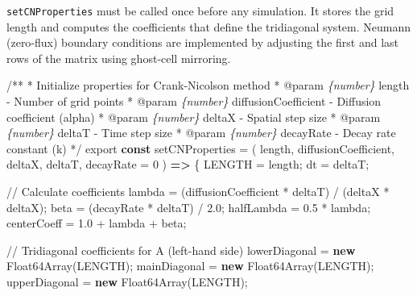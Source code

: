 \documentclass[
  letterpaper,
  DIV=11,
  numbers=noendperiod]{scrreprt}
\newenvironment{Shaded}{\begin{snugshade}}{\end{snugshade}}
\newcommand{\AnnotationTok}[1]{\textcolor[rgb]{0.37,0.37,0.37}{#1}}
\newcommand{\BuiltInTok}[1]{\textcolor[rgb]{0.00,0.23,0.31}{#1}}
\newcommand{\CommentTok}[1]{\textcolor[rgb]{0.37,0.37,0.37}{#1}}
\newcommand{\CommentVarTok}[1]{\textcolor[rgb]{0.37,0.37,0.37}{\textit{#1}}}
\newcommand{\DecValTok}[1]{\textcolor[rgb]{0.68,0.00,0.00}{#1}}
\newcommand{\FloatTok}[1]{\textcolor[rgb]{0.68,0.00,0.00}{#1}}
\newcommand{\ImportTok}[1]{\textcolor[rgb]{0.00,0.46,0.62}{#1}}
\newcommand{\KeywordTok}[1]{\textcolor[rgb]{0.00,0.23,0.31}{\textbf{#1}}}
\newcommand{\NormalTok}[1]{\textcolor[rgb]{0.00,0.23,0.31}{#1}}
\newcommand{\OperatorTok}[1]{\textcolor[rgb]{0.37,0.37,0.37}{#1}}
\begin{document}
\texttt{setCNProperties} must be called once before any simulation. It
stores the grid length and computes the coefficients that define the
tridiagonal system. Neumann (zero‑flux) boundary conditions are
implemented by adjusting the first and last rows of the matrix using
ghost‑cell mirroring.

\label{cn-set-properties}%
\begin{Shaded}
\begin{Highlighting}[]
\CommentTok{/**}
\CommentTok{ * Initialize properties for Crank{-}Nicolson method}
\CommentTok{ * }\AnnotationTok{@param}\CommentTok{ }\CommentVarTok{\{number\}}\CommentTok{ length {-} Number of grid points}
\CommentTok{ * }\AnnotationTok{@param}\CommentTok{ }\CommentVarTok{\{number\}}\CommentTok{ diffusionCoefficient {-} Diffusion coefficient (alpha)}
\CommentTok{ * }\AnnotationTok{@param}\CommentTok{ }\CommentVarTok{\{number\}}\CommentTok{ deltaX {-} Spatial step size}
\CommentTok{ * }\AnnotationTok{@param}\CommentTok{ }\CommentVarTok{\{number\}}\CommentTok{ deltaT {-} Time step size}
\CommentTok{ * }\AnnotationTok{@param}\CommentTok{ }\CommentVarTok{\{number\}}\CommentTok{ decayRate {-} Decay rate constant (k)}
\CommentTok{ */}
\ImportTok{export} \KeywordTok{const}\NormalTok{ setCNProperties }\OperatorTok{=}\NormalTok{ (}
\NormalTok{    length}\OperatorTok{,}
\NormalTok{    diffusionCoefficient}\OperatorTok{,}
\NormalTok{    deltaX}\OperatorTok{,}
\NormalTok{    deltaT}\OperatorTok{,}
\NormalTok{    decayRate }\OperatorTok{=} \DecValTok{0}
\NormalTok{) }\KeywordTok{=\textgreater{}}\NormalTok{ \{}
\NormalTok{    LENGTH }\OperatorTok{=}\NormalTok{ length}\OperatorTok{;}
\NormalTok{    dt }\OperatorTok{=}\NormalTok{ deltaT}\OperatorTok{;}

    \CommentTok{// Calculate coefficients}
\NormalTok{    lambda }\OperatorTok{=}\NormalTok{ (diffusionCoefficient }\OperatorTok{*}\NormalTok{ deltaT) }\OperatorTok{/}\NormalTok{ (deltaX }\OperatorTok{*}\NormalTok{ deltaX)}\OperatorTok{;}
\NormalTok{    beta }\OperatorTok{=}\NormalTok{ (decayRate }\OperatorTok{*}\NormalTok{ deltaT) }\OperatorTok{/} \FloatTok{2.0}\OperatorTok{;}
\NormalTok{    halfLambda }\OperatorTok{=} \FloatTok{0.5} \OperatorTok{*}\NormalTok{ lambda}\OperatorTok{;}
\NormalTok{    centerCoeff }\OperatorTok{=} \FloatTok{1.0} \OperatorTok{+}\NormalTok{ lambda }\OperatorTok{+}\NormalTok{ beta}\OperatorTok{;}

    \CommentTok{// Tridiagonal coefficients for A (left{-}hand side)}
\NormalTok{    lowerDiagonal }\OperatorTok{=} \KeywordTok{new} \BuiltInTok{Float64Array}\NormalTok{(LENGTH)}\OperatorTok{;}
\NormalTok{    mainDiagonal }\OperatorTok{=} \KeywordTok{new} \BuiltInTok{Float64Array}\NormalTok{(LENGTH)}\OperatorTok{;}
\NormalTok{    upperDiagonal }\OperatorTok{=} \KeywordTok{new} \BuiltInTok{Float64Array}\NormalTok{(LENGTH)}\OperatorTok{;}


\end{Highlighting}
\end{Shaded}
\end{document}
